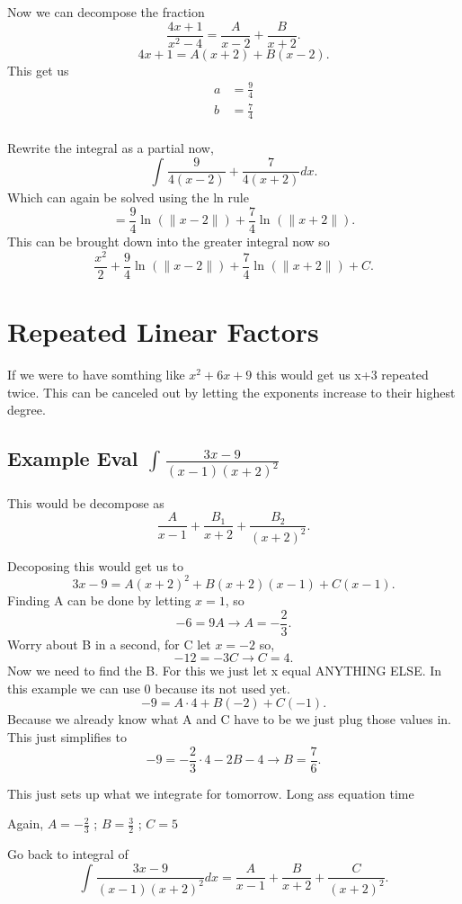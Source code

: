 \documentclass[a4paper]{article}
\begin{document}
Now we can decompose the fraction
\[
\frac{4x+1}{x^2-4}=\frac{A}{x-2}+\frac{B}{x+2}
.\] 
\[
4x+1=A(x+2)+B(x-2)
.\] 
This get us 
\begin{align*}
  a&= \frac{9}{4} \\
  b&= \frac{7}{4} \\
\end{align*}

Rewrite the integral as a partial now,
\[
\int_{}^{} \frac{9}{4(x-2)}+\frac{7}{4(x+2)}dx 
.\] 
Which can again be solved using the ln rule
\[
=\frac{9}{4}\ln^{}(\|x-2\|)+\frac{7}{4}\ln^{}(\|x+2\|)
.\] 
This can be brought down into the greater integral now so
\[
\frac{x^2}{2}+ \frac{9}{4}\ln^{}(\|x-2\|)+\frac{7}{4}\ln^{}(\|x+2\|)+C
.\] 

\section{Repeated Linear Factors}%
\label{sec:Repeated Linear Factors}

If we were to have somthing like $x^2+6x+9$ this would get us x+3 repeated twice. This can be canceled out by letting the exponents increase to their highest degree.
\subsection{Example Eval $\int_{}^{} \frac{3x-9}{(x-1)(x+2)^2} $}%

This would be decompose as
\[
\frac{A}{x-1}+\frac{B_{1}}{x+2}+\frac{B_{2}}{(x+2)^2}
.\] 
\newpage

Decoposing this would get us to 
\[
3x-9=A(x+2)^2+B(x+2)(x-1)+C(x-1)
.\] 
Finding A can be done by letting $x=1$, so 
\[
-6=9A \to A=-\frac{2}{3}
.\] 
Worry about B in a second, for C let $x=-2$ so,
\[
-12=-3C \to C=4
.\] 
Now we need to find the B. For this we just let x equal ANYTHING ELSE. In this example we can use 0 because its not used yet.
\[
-9=A\cdot 4 + B(-2)+C(-1)
.\] 
Because we already know what A and C have to be we just plug those values in.
This just simplifies to 
\[
-9=-\frac{2}{3}\cdot 4 - 2B- 4 \to B=\frac{7}{6}
.\] 

This just sets up what we integrate for tomorrow. Long ass equation time

Again, $A=-\frac{2}{3}$ ; $B=\frac{3}{2}$ ; $C=5$ 

Go back to integral of
\[
\int_{}^{} \frac{3x-9}{(x-1)(x+2)^2}dx=\frac{A}{x-1}+\frac{B}{x+2}+\frac{C}{(x+2)^2} 
.\] 
\end{document}
